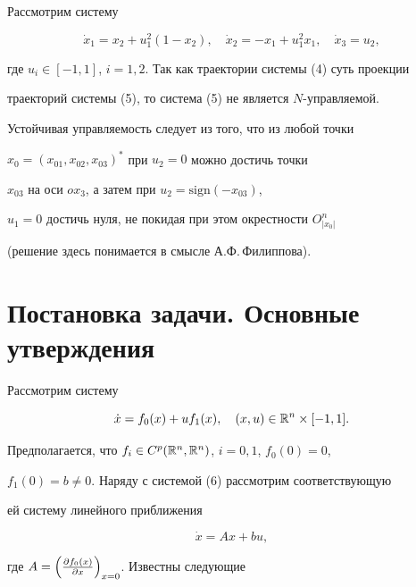 Рассмотрим систему


\begin{equation}


\Dot x_1=x_2+u_1^2(1-x_2),\quad


\Dot x_2=-x_1+u_1^2x_1,\quad


\Dot x_3=u_2,


\end{equation}


где $u_{i}\in[-1,1]$, $i=1,2$. Так как траектории системы (4) суть проекции


траекторий системы (5), то система (5) не является $N$-управляемой.


Устойчивая управляемость следует из того, что из любой точки


$x_0=(x_{01},x_{02},x_{03})^{*}$ при $u_2=0$ можно достичь точки


$x_{03}$ на оси $ox_3$, а затем при $u_2={\mathrm{sign}}(-x_{03})$,


$u_1=0$ достичь нуля, не покидая при этом окрестности $O^n_{|x_0|}$


(решение здесь понимается в смысле А.Ф.\,Филиппова).





\section{Постановка задачи. Основные утверждения}





Рассмотрим систему


\begin{equation}


\Dot x = f_0(x) + uf_1(x),\quad (x,u)\in \R^n\times[-1,1].


\end{equation}


Предполагается, что $f_{i}\in C^p(\Bbb R^n,\Bbb R^n)$, $i=0,1$, $f_0(0)=0$,


$f_1(0)=b\ne 0$. Наряду с системой (6) рассмотрим соответствующую


ей систему линейного приближения


\begin{equation}


\Dot x = Ax + bu,


\end{equation}


где $A=\left(\frac{\partial f_0(x)}{\partial x}\right)_{x=0}$. Известны следующие


